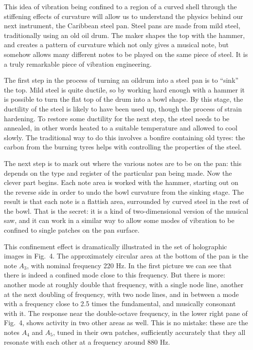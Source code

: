   This idea of vibration being confined to a region of a curved shell through 
  the stiffening effects of curvature will allow us to understand the physics 
  behind our next instrument, the Caribbean steel pan. Steel pans are made from 
  mild steel, traditionally using an old oil drum. The maker shapes the top 
  with the hammer, and creates a pattern of curvature which not only gives a 
  musical note, but somehow allows many different notes to be played on the 
  same piece of steel. It is a truly remarkable piece of vibration engineering. 

  The first step in the process of turning an oildrum into a steel pan is to 
  ``sink'' the top. Mild steel is quite ductile, so by working hard enough with 
  a hammer it is possible to turn the flat top of the drum into a bowl shape. 
  By this stage, the ductility of the steel is likely to have been used up, 
  though the process of strain hardening. To restore some ductility for the 
  next step, the steel needs to be annealed, in other words heated to a 
  suitable temperature and allowed to cool slowly. The traditional way to do 
  this involves a bonfire containing old tyres: the carbon from the burning 
  tyres helps with controlling the properties of the steel. 

  The next step is to mark out where the various notes are to be on the pan: 
  this depends on the type and register of the particular pan being made. Now 
  the clever part begins. Each note area is worked with the hammer, starting 
  out on the reverse side in order to undo the bowl curvature from the sinking 
  stage. The result is that each note is a flattish area, surrounded by curved 
  steel in the rest of the bowl. That is the secret: it is a kind of 
  two-dimensional version of the musical saw, and it can work in a similar way 
  to allow some modes of vibration to be confined to single patches on the pan 
  surface. 

  This confinement effect is dramatically illustrated in the set of holographic 
  images in Fig.\ 4. The approximately circular area at the bottom of the pan 
  is the note $A_3$, with nominal frequency 220 Hz. In the first picture we can 
  see that there is indeed a confined mode close to this frequency. But there 
  is more: another mode at roughly double that frequency, with a single node 
  line, another at the next doubling of frequency, with two node lines, and in 
  between a mode with a frequency close to 2.5 times the fundamental, and 
  musically consonant with it. The response near the double-octave frequency, 
  in the lower right pane of Fig.\ 4, shows activity in two other areas as 
  well. This is no mistake: these are the notes $A_4$ and $A_5$, tuned in their 
  own patches, sufficiently accurately that they all resonate with each other 
  at a frequency around 880 Hz. 

